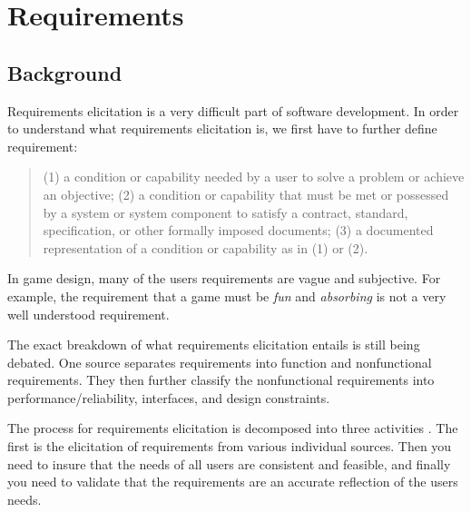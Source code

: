 \section{Requirements}
\subsection{Background}
Requirements elicitation is a very difficult part of software development. In order to understand what requirements elicitation is, we first have to further define requirement\cite[p. 62]{september1990ieee}:
\begin{quote}
	(1) a condition or capability needed by a user to solve a problem or achieve an objective; (2) a condition or capability that must be met or possessed by a system or system component to satisfy a contract, standard, specification, or other formally imposed documents; (3) a documented representation of a condition or capability as in (1) or (2).
\end{quote}
In game design, many of the users requirements are vague and subjective. For example, the requirement that a game must be \emph{fun} and \emph{absorbing} is not a very well understood requirement. 

The exact breakdown of what requirements elicitation entails is still being debated. One source separates requirements into function and nonfunctional requirements\cite{southwell1987requirements}. They then further classify the nonfunctional requirements into performance/reliability, interfaces, and design constraints.

The process for requirements elicitation is decomposed into three activities \cite{rzepka1989requirements}. The first is the elicitation of requirements from various individual sources. Then you need to insure that the needs of all users are consistent and feasible, and finally you need to validate that the requirements are an accurate reflection of the users needs.

